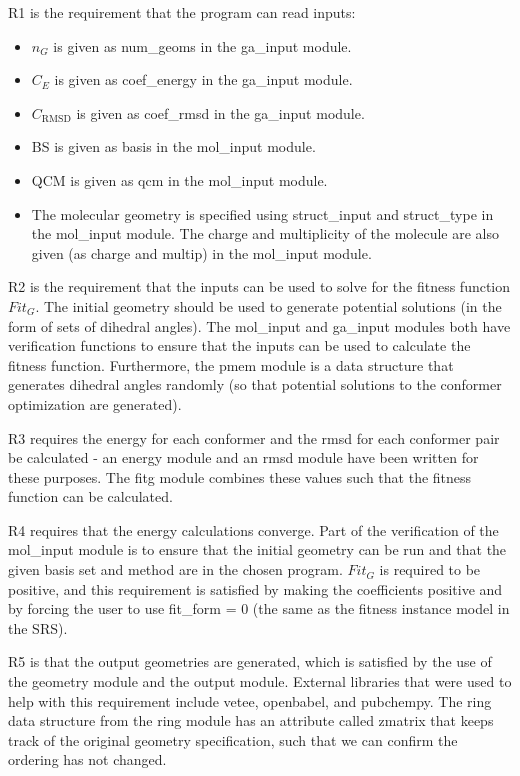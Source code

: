 \documentclass[12pt, titlepage]{article}
\begin{document}
R1 is the requirement that the program can read inputs:
\begin{itemize}
	\item $n_G$ is given as num\_geoms in the ga\_input module.
	\item $C_E$ is given as coef\_energy in the ga\_input module.
	\item $C_\text{RMSD}$ is given as coef\_rmsd in the ga\_input module.
	\item BS is given as basis in the mol\_input module.
	\item QCM is given as qcm in the mol\_input module.
	\item The molecular geometry is specified using struct\_input and 
	struct\_type in the mol\_input module. The charge and multiplicity of the 
	molecule are also given (as charge and multip) in the mol\_input module.
\end{itemize}

R2 is the requirement that the inputs can be used to solve for the fitness 
function $Fit_G$. The initial geometry should be used to generate potential 
solutions (in the form of sets of dihedral angles). The mol\_input and 
ga\_input modules both have verification functions to ensure that the inputs 
can be used to calculate the fitness function. Furthermore, the pmem module is 
a data structure that generates dihedral angles randomly (so that potential 
solutions to the conformer optimization are generated).

R3 requires the energy for each conformer and the rmsd for each conformer pair 
be calculated - an energy module and an rmsd module have been written for these 
purposes. The fitg module combines these values such that the fitness function 
can be calculated.

R4 requires that the energy calculations converge. Part of the verification of 
the mol\_input module is to ensure that the initial geometry can be run and 
that the given basis set and method are in the chosen program. $Fit_G$ is 
required to be positive, and this requirement is satisfied by making the 
coefficients positive and by forcing the user to use fit\_form = 0 (the same as 
the fitness instance model in the SRS).

R5 is that the output geometries are generated, which is satisfied by the use 
of the geometry module and the output module. External libraries that were used 
to help with this requirement include vetee, openbabel, and pubchempy. The ring 
data structure from the ring module has an attribute called zmatrix that keeps 
track of the original geometry specification, such that we can confirm the 
ordering has not changed.
\end{document}
